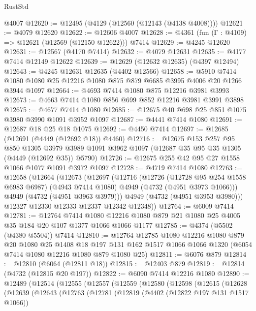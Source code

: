 \begin{lexlean}{RustStd}
\begin{coremodule}
{\begin{coremodule}
{{{{{{{{{{{{{{    @4007
@12620 := @12495 (@4129 (@12560 (@12143 (@4138 @4008))))
@12621 := @4079 @12620
@12622 := @12606 @4007
@12628 := @4361 (fun (Γ : @4109) => @12621 (@12569 (@12150 @12622))) @7414
@12629 := @4245 @12620
@12631 := @12567 (@4170 @7414)
@12632 := @4079 @12631
@12635 := @4177 @7414 @12149 @12622
@12639 := @12629 (@12632 @12635) (@4397 @12494)
@12643 := @4245 @12631 @12635 (@4402 @12566)
@12658 := @5910 @7414 @1080 @1080 @25 @12216 @1080 @875 @879 @6685 @3995 @4006 @20 @1266 @3944 @1097
@12664 := @4693 @7414 @1080 @875 @12216 @3981 @3993
@12673 := @4663 @7414 @1080 @856 @699 @852 @12216 @3981 @3991 @3898
@12675 := @4677 @7414 @1080
@12685 := @12675 @40 @698 @25 @851 @1075 @3980 @3990 @1091 @3952 @1097
@12687 := @4441 @7414 @1080
@12691 := @12687 @18 @25 @18 @1075
@12692 := @4450 @7414
@12697 := @12685 (@12691 (@4449 (@12692 @18)) @4460)
@12716 := @12675
    @153
    @257
    @95
    @850
    @1305
    @3979
    @3989
    @1091
    @3962
    @1097
    (@12687 @35 @95 @35 @1305 (@4449 (@12692 @35)) @5790)
@12726 := @12675 @255 @42 @95 @27 @1558 @1066 @1077 @1091 @3972 @1097
@12728 := @4719 @7414 @1080
@12763 := @12658
    (@12664
      (@12673
        (@12697
          (@12716
            (@12726
              (@12728 @95 @254 @1558 @6983 @6987)
              (@4943 @7414 @1080)
              @4949
              (@4732 (@4951 @3973 @1066)))
            @4949
            (@4732 (@4951 @3963 @3979)))
          @4949
          (@4732 (@4951 @3953 @3980)))
        @12327
        @12330
        @12333
        @12337
        @12342
        @12348))
@12764 := @6009 @7414
@12781 := @12764
    @7414
    @1080
    @12216
    @1080
    @879
    @21
    @1080
    @25
    @4005
    @35
    @184
    @20
    @107
    @1377
    @1066
    @1066
    @1177
@12785 := @4374 (@5502 (@4380 @5504)) @7414
@12810 := @12764
    @12785
    @1080
    @12216
    @1080
    @879
    @20
    @1080
    @25
    @1408
    @18
    @197
    @131
    @162
    @1517
    @1066
    @1066
    @1320
    (@6054 @7414 @1080 @12216 @1080 @879 @1080 @25)
@12811 := @6076 @879
@12814 := @12810 (@6064 (@12811 @18))
@12815 := @12403 @879
@12819 := @12814 (@4732 (@12815 @20 @197))
@12822 := @6090 @7414 @12216 @1080
@12890 := @12489
    (@12514
      (@12555
        (@12557
          (@12559
            (@12580
              (@12598
                (@12615
                  (@12628
                    (@12639
                      (@12643
                        (@12763
                          (@12781
                            (@12819
                              (@4402 (@12822 @197 @131 @1517 @1066))
}}}}}}}}}}}}}}
\end{coremodule}}
\end{coremodule}
\end{lexlean}
